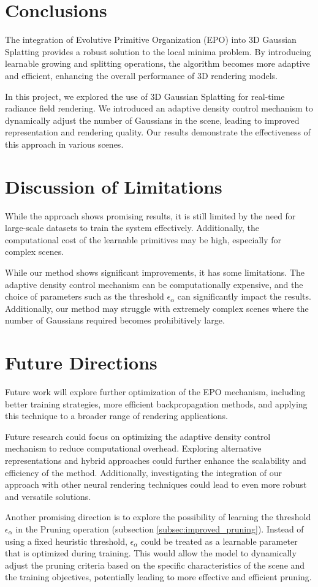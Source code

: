 \documentclass[11pt]{report}
\begin{document}
\section{Conclusions}

The integration of Evolutive Primitive Organization (EPO) into 3D Gaussian Splatting provides a robust solution to the local minima problem. By introducing learnable growing and splitting operations, the algorithm becomes more adaptive and efficient, enhancing the overall performance of 3D rendering models.

In this project, we explored the use of 3D Gaussian Splatting for real-time radiance field rendering. We introduced an adaptive density control mechanism to dynamically adjust the number of Gaussians in the scene, leading to improved representation and rendering quality. Our results demonstrate the effectiveness of this approach in various scenes.

\section{Discussion of Limitations}

While the approach shows promising results, it is still limited by the need for large-scale datasets to train the system effectively. Additionally, the computational cost of the learnable primitives may be high, especially for complex scenes.

While our method shows significant improvements, it has some limitations. The adaptive density control mechanism can be computationally expensive, and the choice of parameters such as the threshold $\epsilon_\alpha$ can significantly impact the results. Additionally, our method may struggle with extremely complex scenes where the number of Gaussians required becomes prohibitively large.

\section{Future Directions}

Future work will explore further optimization of the EPO mechanism, including better training strategies, more efficient backpropagation methods, and applying this technique to a broader range of rendering applications.

Future research could focus on optimizing the adaptive density control mechanism to reduce computational overhead. Exploring alternative representations and hybrid approaches could further enhance the scalability and efficiency of the method. Additionally, investigating the integration of our approach with other neural rendering techniques could lead to even more robust and versatile solutions.

Another promising direction is to explore the possibility of learning the threshold $\epsilon_\alpha$ in the Pruning operation (subsection \ref{subsec:improved_pruning}). Instead of using a fixed heuristic threshold, $\epsilon_\alpha$ could be treated as a learnable parameter that is optimized during training. This would allow the model to dynamically adjust the pruning criteria based on the specific characteristics of the scene and the training objectives, potentially leading to more effective and efficient pruning.
\end{document}
